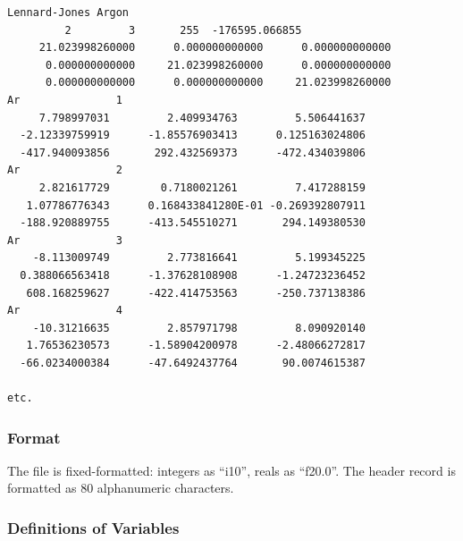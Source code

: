 \begin{verbatim}
Lennard-Jones Argon
         2         3       255  -176595.066855    
     21.023998260000      0.000000000000      0.000000000000
      0.000000000000     21.023998260000      0.000000000000
      0.000000000000      0.000000000000     21.023998260000
Ar               1
     7.798997031         2.409934763         5.506441637    
  -2.12339759919      -1.85576903413      0.125163024806    
  -417.940093856       292.432569373      -472.434039806    
Ar               2
     2.821617729        0.7180021261         7.417288159    
   1.07786776343      0.168433841280E-01 -0.269392807911    
  -188.920889755      -413.545510271       294.149380530    
Ar               3
    -8.113009749         2.773816641         5.199345225    
  0.388066563418      -1.37628108908      -1.24723236452    
   608.168259627      -422.414753563      -250.737138386    
Ar               4
    -10.31216635         2.857971798         8.090920140    
   1.76536230573      -1.58904200978      -2.48066272817    
  -66.0234000384      -47.6492437764       90.0074615387    

etc.
\end{verbatim}

\subsubsection{Format}

The file is fixed-formatted: integers as ``i10'', reals as ``f20.0''.
The header record is formatted as 80 alphanumeric characters.

\subsubsection{Definitions of Variables}

